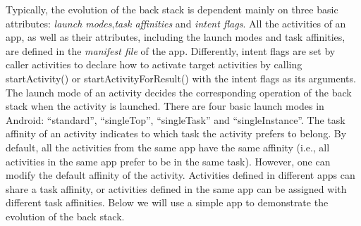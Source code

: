 Typically, the evolution of the back stack is dependent mainly on three basic attributes: \emph{launch modes},\emph{task affinities} and \emph{intent flags}. All the activities of an app, as well as their attributes, including the launch modes and task affinities, are defined in the \emph{manifest file} of the app. Differently, intent flags are set by caller activities to declare how to activate target activities by calling startActivity() or startActivityForResult() with the intent flags as its arguments. The launch mode of an activity decides the corresponding operation of the back stack when the activity is launched. There are four basic launch modes in Android: ``standard'', ``singleTop'', ``singleTask'' and ``singleInstance''. The task affinity of an activity indicates to which task the activity prefers to belong. By default, all the activities from the same app have the same affinity (i.e., all activities in the same app prefer to be in the same task). However, one can modify the default affinity of the activity. Activities defined in different apps can share a task affinity, or activities defined in the same app can be assigned with different task affinities. Below we will use a simple app to demonstrate the evolution of the back stack.


